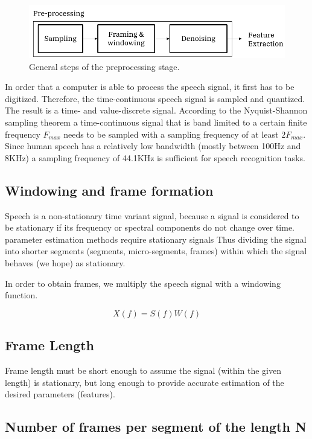 \documentclass[12pt, a4paper, twoside]{report}
\begin{document}
\begin{figure}[ht]
	\centering
	\includegraphics[width=1\textwidth]
	{images/chapter2/general-pre-steps}
	\caption{General steps of the preprocessing stage.}
	\label{fig:general-pre-steps}
\end{figure}

In order that a computer is able to process the speech signal, it first has to be digitized. Therefore, the time-continuous speech signal is sampled and quantized. The result is a time- and value-discrete signal. According to the Nyquist-Shannon sampling theorem a time-continuous signal that is band limited to a certain finite frequency $F_{max}$ needs to be sampled with a sampling frequency of at least $2F_{max}$. Since human speech has a relatively low bandwidth (mostly between 100Hz and 8KHz) a sampling frequency of 44.1KHz is sufficient for speech recognition tasks.

\subsection{Windowing and frame formation}
Speech is a non-stationary time variant signal, because a signal is considered to be stationary if its frequency or spectral components do not change over time. parameter estimation methods require stationary signals Thus dividing the signal into shorter segments (segments, micro-segments, frames) within which the signal behaves (we hope) as stationary.
\par
In order to obtain frames, we multiply the speech signal with a windowing function.

\begin{equation*}
X(f) = S(f) W(f)
\end{equation*}

\subsection{Frame Length}
Frame length must be short enough to assume the signal (within the given length) is stationary, but long enough to provide accurate estimation of the desired parameters (features).

\subsection{Number of frames per segment of the length N}
\end{document}
